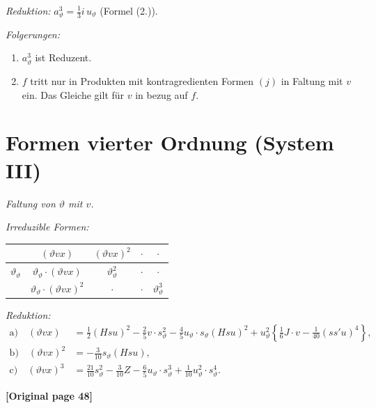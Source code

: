 \documentclass[12pt,a4paper]{article}
\begin{document}
\textit{Reduktion:} $a_\vartheta^3 = \tfrac{1}{3} i \, u_\vartheta$ (Formel (2.)).

\textit{Folgerungen:}
\begin{enumerate}
\item[1)] $a_\vartheta^3$ ist Reduzent.
\item[2)] $f$ tritt nur in Produkten mit kontragredienten Formen $(j)$ in Faltung mit $v$ ein. Das Gleiche gilt für $v$ in bezug auf $f$.
\end{enumerate}

\section{Formen vierter Ordnung (System III)}

\textit{Faltung von $\vartheta$ mit $v$.}

\textit{Irreduzible Formen:}
\begin{center}
\begin{tabular}{c|cccc}
& $(\vartheta vx)$ & $(\vartheta vx)^2$ & $\cdot$ & $\cdot$ \\
\hline
$\vartheta_\vartheta$ & $\vartheta_\vartheta \cdot (\vartheta vx)$ & $\vartheta_\vartheta^2$ & $\cdot$ & $\cdot$ \\
& $\vartheta_\vartheta \cdot (\vartheta vx)^2$ & $\cdot$ & $\cdot$ & $\vartheta_\vartheta^3$
\end{tabular}
\end{center}

\textit{Reduktion:}
\begin{equation}\tag{7.}
\begin{aligned}
\text{a)} \quad (\vartheta vx) &= \tfrac{1}{2}(Hsu)^2 - \tfrac{2}{5}v \cdot s_\vartheta^2 - \tfrac{4}{5} u_\vartheta \cdot s_\vartheta (Hsu)^2 + u_\vartheta^2 \left\{\tfrac{1}{6}J \cdot v - \tfrac{1}{40}(ss'u)^4\right\},\\
\text{b)} \quad (\vartheta vx)^2 &= -\tfrac{3}{10} s_\vartheta (Hsu),\\
\text{c)} \quad (\vartheta vx)^3 &= \tfrac{21}{10} s_\vartheta^2 - \tfrac{3}{10}Z - \tfrac{6}{5} u_\vartheta \cdot s_\vartheta^3 + \tfrac{1}{10} u_\vartheta^2 \cdot s_\vartheta^4.
\end{aligned}
\end{equation}

\noindent\textbf{[Original page 48]}
\end{document}
